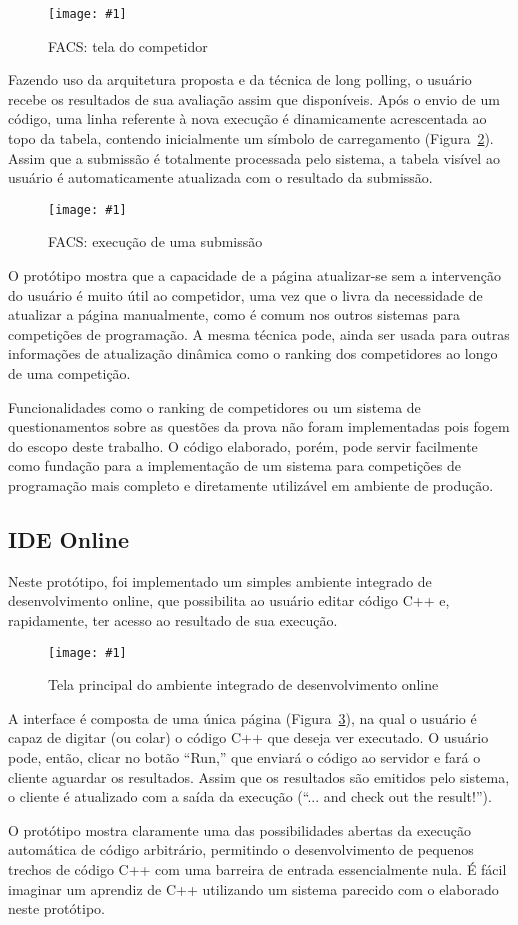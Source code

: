 \documentclass[ruledheader, 12pt]{abnt}
\newcommand{\figcustom}[4]{\par
	\begin{figure}[#3]
		\centering
		\texttt{[image: \#1]}
		\caption{\label{fig:#1}#2}
	\end{figure}
\par}
\newcommand{\fig}[2]{\figcustom{#1}{#2}{bp}{1}}
\newcommand{\figref}[1]{(Figura~\ref{fig:#1})}
\begin{document}
\fig{facs}{FACS: tela do competidor}

Fazendo uso da arquitetura proposta e da técnica de long polling, o usuário recebe os resultados de sua avaliação assim que disponíveis. Após o envio de um código, uma linha referente à nova execução é dinamicamente acrescentada ao topo da tabela, contendo inicialmente um símbolo de carregamento \figref{facs-running}. Assim que a submissão é totalmente processada pelo sistema, a tabela visível ao usuário é automaticamente atualizada com o resultado da submissão.

\fig{facs-running}{FACS: execução de uma submissão}

O protótipo mostra que a capacidade de a página atualizar-se sem a intervenção do usuário é muito útil ao competidor, uma vez que o livra da necessidade de atualizar a página manualmente, como é comum nos outros sistemas para competições de programação. A mesma técnica pode, ainda ser usada para outras informações de atualização dinâmica como o ranking dos competidores ao longo de uma competição.

Funcionalidades como o ranking de competidores ou um sistema de questionamentos sobre as questões da prova não foram implementadas pois fogem do escopo deste trabalho. O código elaborado, porém, pode servir facilmente como fundação para a implementação de um sistema para competições de programação mais completo e diretamente utilizável em ambiente de produção.

\subsection{IDE Online}

Neste protótipo, foi implementado um simples ambiente integrado de desenvolvimento online, que possibilita ao usuário editar código C++ e, rapidamente, ter acesso ao resultado de sua execução.

\figcustom{ide}{Tela principal do ambiente integrado de desenvolvimento online}{bp}{.9}

A interface é composta de uma única página \figref{ide}, na qual o usuário é capaz de digitar (ou colar) o código C++ que deseja ver executado. O usuário pode, então, clicar no botão ``Run,'' que enviará o código ao servidor e fará o cliente aguardar os resultados. Assim que os resultados são emitidos pelo sistema, o cliente é atualizado com a saída da execução (``... and check out the result!'').

O protótipo mostra claramente uma das possibilidades abertas da execução automática de código arbitrário, permitindo o desenvolvimento de pequenos trechos de código C++ com uma barreira de entrada essencialmente nula. É fácil imaginar um aprendiz de C++ utilizando um sistema parecido com o elaborado neste protótipo.
\end{document}
